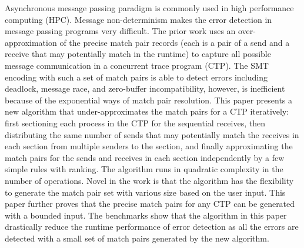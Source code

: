 Asynchronous message passing paradigm is commonly used in high performance computing (HPC).
Message non-determinism makes the error detection in message passing programs very difficult. The prior work uses an over-approximation of the precise match pair records (each is a pair of a send and a receive that may potentially match in the runtime) to capture all possible message communication in a concurrent trace program (CTP). The SMT encoding with such a set of match pairs is able to detect errors including deadlock, message race, and zero-buffer incompatibility, however, is inefficient because of the exponential ways of match pair resolution.
This paper presents a new algorithm that under-approximates the match pairs for a CTP iteratively: first sectioning each process in the CTP for the sequential receives, then distributing the same number of sends that may potentially match the receives in each section from multiple senders to the section, and finally approximating the match pairs for the sends and receives in each section independently by a few simple rules with ranking. The algorithm runs in quadratic complexity in the number of operations. Novel in the work is that the algorithm has the flexibility to generate the match pair set with various size based on the user input. This paper further proves that the precise match pairs for any CTP can be generated with a bounded input. The benchmarks show that the algorithm in this paper drastically reduce the runtime performance of error detection as all the errors are detected with a small set of match pairs generated by the new algorithm.